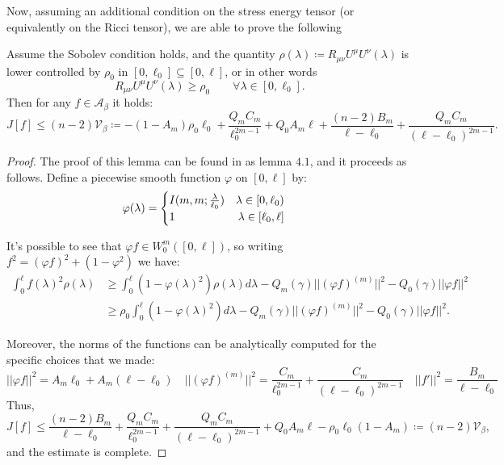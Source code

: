 Now, assuming an additional condition on the stress energy tensor (or equivalently on the Ricci tensor), we are able to prove the following

\begin{lemma}
	\label{lemma:J-sobolev-condition}
	Assume the Sobolev condition holds, and the quantity \(\rho(\lambda) \coloneqq R_{\mu\nu}U^{\mu}U^{\nu}(\lambda) \) is lower controlled by \(\rho_0\) in \([0, \ell_0] \subseteq [0, \ell]\), or in other words
	\[
	   R_{\mu\nu}U^{\mu}U^{\nu}(\lambda) \ge \rho_0 \quad\quad \forall\lambda\in [0, \ell_0].
   \]
	Then for any \(f\in \mathcal{A}_{\beta}\) it holds:
	\begin{equation}
		\label{eq:J-sobolev-condition}
		J[f] \le (n - 2)\mathcal{V}_{\beta} \coloneqq -(1-A_m)\rho_0\ell_0 + \frac{Q_mC_m}{\ell_0^{2m-1}} + Q_0A_m\ell + \frac{(n - 2)B_m}{\ell - \ell_0} + \frac{Q_mC_m}{(\ell-\ell_0)^{2m-1}}.
	\end{equation}
\end{lemma}

\begin{proof}
	The proof of this lemma can be found in \cite{fewster2020new} as lemma \(4.1\), and it proceeds as follows. Define a piecewise smooth function \(\varphi\) on \([0,\ell]\) by:
	\[
	\varphi(\lambda) = 
	\begin{cases}
		I(m, m;\frac{\lambda}{\ell_0}) \quad \hfill \lambda \in [0, \ell_0) \\
		1 \hfill \lambda \in [\ell_0, \ell]
	\end{cases}	
	\]
	
	It's possible to see that \(\varphi f \in W_0^m([0,\ell])\), so writing \(f^2 = (\varphi f)^2 + (1 - \varphi^2)\) we have:
	\begin{align*}
		\int_0^{\ell} f(\lambda)^2\rho(\lambda) &\ge \int_0^{\ell} (1 - \varphi(\lambda)^2)\rho(\lambda)d\lambda - Q_m(\gamma) \vert\vert (\varphi f)^{(m)}\vert\vert^2 - Q_0(\gamma) \vert\vert \varphi f\vert\vert^2 \\
		&\ge  \rho_0\int_0^{\ell} (1 - \varphi(\lambda)^2)d\lambda - Q_m(\gamma) \vert\vert (\varphi f)^{(m)}\vert\vert^2 - Q_0(\gamma) \vert\vert \varphi f\vert\vert^2.
	\end{align*}

	Moreover, the norms of the functions can be analytically computed for the specific choices that we made:
	\[
		\vert\vert \varphi f\vert\vert^2 = A_m\ell_0 + A_m(\ell - \ell_0)\quad
		\vert\vert (\varphi f)^{(m)}\vert\vert^2 = \frac{C_m}{\ell_0^{2m - 1}} + \frac{C_m}{(\ell - \ell_0)^{2m - 1}}
		\quad
		\vert\vert f'\vert\vert^2 = \frac{B_m}{\ell - \ell_0}
	\]
	Thus,
	\[
		J[f] \le \frac{(n - 2)B_m}{\ell - \ell_0} + \frac{Q_mC_m}{\ell_0^{2m - 1}} + \frac{Q_mC_m}{(\ell - \ell_0)^{2m - 1}} + Q_0A_m\ell - \rho_0\ell_0(1 - A_m) \coloneqq (n-2)\mathcal{V}_{\beta},
	\]
	and the estimate is complete.
\end{proof}


